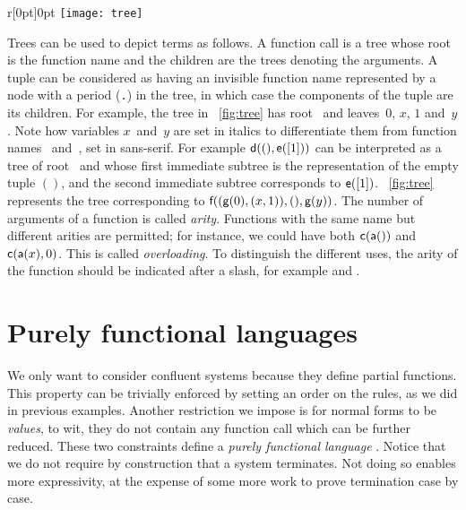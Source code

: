%
\begin{wrapfigure}[8]{r}[0pt]{0pt}
\centering
\texttt{[image: tree]}%
\caption{\label{fig:tree}}
\end{wrapfigure}
Trees can be used to depict terms as follows. A function call is a
tree whose root is the function name and the children are the trees
denoting the arguments. A tuple can be considered as having an
invisible function name represented by a node with a period
(\texttt{.}) in the tree, in which case the components of the tuple
are its children. For example, the tree in \fig~\vref{fig:tree} has
root~ and leaves~\(0\), \(x\), \(1\) and~\(y\). Note how
variables \(x\)~and~\(y\) are set in italics to differentiate them
from function names ~and~, set in
\textsf{sans\hyp{}serif}. For example \(\textsf{d}((), \textsf{e}([1]))\)
can be interpreted as a tree of root~ and whose first immediate
subtree is the representation of the empty tuple \(()\), and the
second immediate subtree corresponds to
\(\textsf{e}([1])\). \Fig~\ref{fig:tree} represents the tree
corresponding to \(\textsf{f}((\textsf{g}(0),(x,1)),(),\textsf{g}(y))\). The
number of arguments of a function is called
\emph{arity}. Functions with the same
name but different arities are permitted; for instance, we could have
both \(\textsf{c}(\textsf{a}())\) and \(\textsf{c}(\textsf{a}(x),0)\). This is
called \emph{overloading}. To
distinguish the different uses, the arity of the function should be
indicated after a slash, for example  and .

\section{Purely functional languages}
\label{sec:functional}

We only want to consider confluent systems because they define partial
functions. This property can be trivially enforced by setting an order
on the rules, as we did in previous examples. Another restriction we
impose is for normal forms to be \emph{values}, to wit, they do not contain any function call which
can be further reduced. These two constraints define a \emph{purely
functional language} \citep{Hughes_1989,Hinsen_2009}. Notice that we do not require by construction that a
system terminates. Not doing so enables more expressivity, at the
expense of some more work to prove termination case by case.

